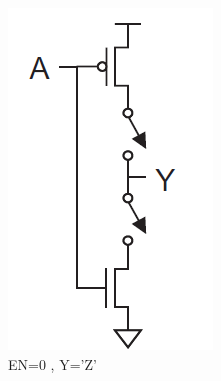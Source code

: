 \documentclass[a4paper,12pt]{article}
\begin{document}
\begin{figure}[H]
\begin{subfigure}[t]{0.3\textwidth}
		\includegraphics[width=.75\linewidth]{images/t/ti2}
		\caption{EN=0 , Y='Z'}
	\end{subfigure}
	\hfill
	\begin{subfigure}[t]{0.3\textwidth}
		\centering

\end{subfigure}
\end{figure}
\end{document}
